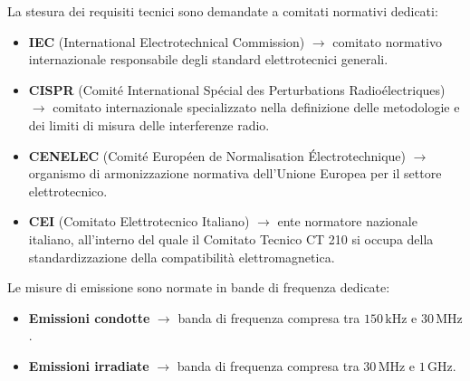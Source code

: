 La stesura dei requisiti tecnici sono demandate a comitati normativi dedicati:
\begin{itemize}
	\item \textbf{IEC} (International Electrotechnical Commission) $\rightarrow$ comitato normativo internazionale responsabile degli standard elettrotecnici generali.
	\item \textbf{CISPR} (Comité International Spécial des Perturbations Radioélectriques) $\rightarrow$ comitato internazionale specializzato nella definizione delle metodologie e dei limiti di misura delle interferenze radio.
	\item \textbf{CENELEC} (Comité Européen de Normalisation Électrotechnique) $\rightarrow$ organismo di armonizzazione normativa dell'Unione Europea per il settore elettrotecnico.
	\item \textbf{CEI} (Comitato Elettrotecnico Italiano) $\rightarrow$ ente normatore nazionale italiano, all'interno del quale il Comitato Tecnico CT 210 si occupa della standardizzazione della compatibilità elettromagnetica.
\end{itemize}

Le misure di emissione sono normate in bande di frequenza dedicate:
\begin{itemize}
	\item \textbf{Emissioni condotte} $\rightarrow$ banda di frequenza compresa tra $150\,\text{kHz}$ e $30\,\text{MHz}$.
	\item \textbf{Emissioni irradiate} $\rightarrow$ banda di frequenza compresa tra $30\,\text{MHz}$ e $1\,\text{GHz}$.
\end{itemize}

